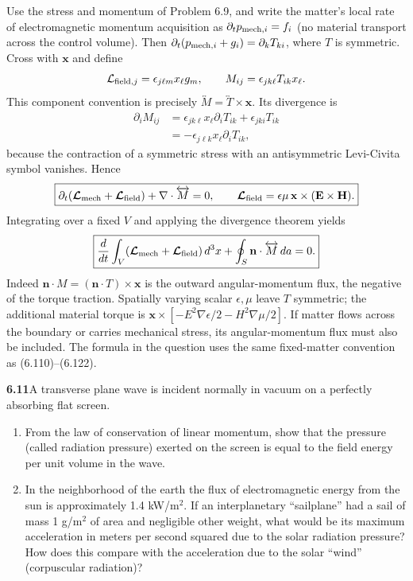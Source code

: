 Use the stress and momentum of Problem 6.9, and write the matter's local
rate of electromagnetic momentum acquisition as
$\partial_t p_{{\rm mech},i}=f_i$ (no material transport across the control
volume). Then $\partial_t(p_{{\rm mech},i}+g_i)=\partial_kT_{ki}$,
where $T$ is symmetric. Cross with $\mathbf x$ and define
\[
\mathcal L_{{\rm field},j}=\epsilon_{j\ell m}x_\ell g_m,
\qquad M_{ij}=\epsilon_{jk\ell}T_{ik}x_\ell.
\]
This component convention is precisely
$\overleftrightarrow M=\overleftrightarrow T\times\mathbf x$.
Its divergence is
\begin{align*}
\partial_iM_{ij}
&=\epsilon_{jk\ell}x_\ell\partial_iT_{ik}
+\epsilon_{jki}T_{ik}\\
&=-\epsilon_{j\ell k}x_\ell\partial_iT_{ik},
\end{align*}
because the contraction of a symmetric stress with an antisymmetric
Levi-Civita symbol vanishes. Hence
\[
\boxed{\partial_t(\boldsymbol{\mathcal L}_{\rm mech}
+\boldsymbol{\mathcal L}_{\rm field})+\nabla\cdot\overleftrightarrow M=0,
\qquad
\boldsymbol{\mathcal L}_{\rm field}=\epsilon\mu\,\mathbf x\times(\mathbf E\times\mathbf H).}
\]
Integrating over a fixed $V$ and applying the divergence theorem yields
\[
\boxed{\frac d{dt}\int_V(\boldsymbol{\mathcal L}_{\rm mech}
+\boldsymbol{\mathcal L}_{\rm field})\,d^3x
+\oint_S\mathbf n\cdot\overleftrightarrow M\,da=0.}
\]
Indeed $\mathbf n\cdot M=(\mathbf n\cdot T)\times\mathbf x$ is the
outward angular-momentum flux, the negative of the torque traction.
Spatially varying scalar $\epsilon,\mu$ leave $T$ symmetric; the additional
material torque is $\mathbf x\times[-E^2\nabla\epsilon/2-H^2\nabla\mu/2]$.
If matter flows across the boundary or carries mechanical stress, its
angular-momentum flux must also be included. The formula in the question
uses the same fixed-matter convention as (6.110)--(6.122).

\par\bigskip
\noindent\textbf{6.11}\quad A transverse plane wave is incident normally in vacuum on a perfectly absorbing flat screen.
\begin{enumerate}
\item[(a)] From the law of conservation of linear momentum, show that the pressure (called radiation pressure) exerted on the screen is equal to the field energy per unit volume in the wave.
\item[(b)] In the neighborhood of the earth the flux of electromagnetic energy from the sun is approximately 1.4 kW/m$^{2}$. If an interplanetary ``sailplane'' had a sail of mass 1 g/m$^{2}$ of area and negligible other weight, what would be its maximum acceleration in meters per second squared due to the solar radiation pressure? How does this compare with the acceleration due to the solar ``wind'' (corpuscular radiation)?
\end{enumerate}
\solution

